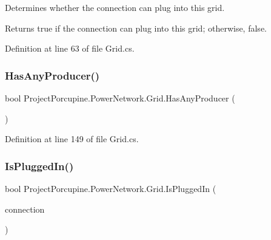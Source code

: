 Determines whether the connection can plug into this grid. 

\begin{DoxyReturn}{Returns}
{\ttfamily true} if the connection can plug into this grid; otherwise, {\ttfamily false}.
\end{DoxyReturn}


Definition at line 63 of file Grid.\+cs.

\mbox{\label{class_project_porcupine_1_1_power_network_1_1_grid_a08ad6cd3b596d237c5b20eb0bcdac963}} 
\subsubsection{\texorpdfstring{Has\+Any\+Producer()}{HasAnyProducer()}}
{\footnotesize\ttfamily bool Project\+Porcupine.\+Power\+Network.\+Grid.\+Has\+Any\+Producer (\begin{DoxyParamCaption}{ }\end{DoxyParamCaption})}



Definition at line 149 of file Grid.\+cs.

\mbox{\label{class_project_porcupine_1_1_power_network_1_1_grid_a738028256ea811fa43b7022798ca527c}} 
\subsubsection{\texorpdfstring{Is\+Plugged\+In()}{IsPluggedIn()}}
{\footnotesize\ttfamily bool Project\+Porcupine.\+Power\+Network.\+Grid.\+Is\+Plugged\+In (\begin{DoxyParamCaption}\item[{\hyperlink{interface_project_porcupine_1_1_power_network_1_1_i_pluggable}{I\+Pluggable}}]{connection }\end{DoxyParamCaption})}



